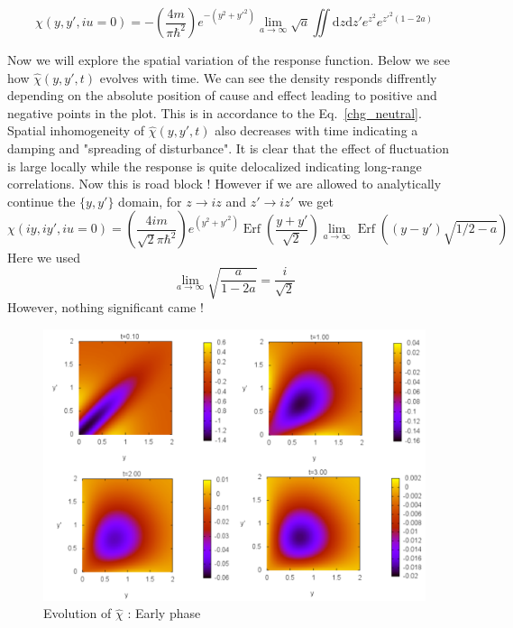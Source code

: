 \documentclass{article}
\newcommand{\eq}{\begin{equation}}
\newcommand{\qe}{\end{equation}}
\DeclareMathOperator{\erf}{Erf}
\newcommand{\lp}{\left(}
\newcommand{\rp}{\right)}
\newcommand{\diff}{\mathrm{d}}
\begin{document}
\eq
\chi(y, y', i u=0)= -\left( \frac{4m}{\pi \hbar^2}\right) e^{-(y^2+{y'}^2)} \lim_{a \to \infty} \sqrt{a} \iint \diff z \diff z' e^{z^2}e^{{z'}^2 \lp 1-2a\rp}
\qe

Now we will explore the spatial variation of the response function. Below we see how $\hat{\chi}(y, y',t)$ evolves with time. We can see the density responds diffrently depending on the absolute position of cause and effect leading to positive and negative points in the plot. This is in accordance to the Eq.~\eqref{chg_neutral}. Spatial inhomogeneity of $\hat{\chi}(y, y',t)$ also decreases with time indicating a damping and "spreading of disturbance". It is clear that the effect of fluctuation is large locally while the response is quite delocalized indicating long-range correlations.
Now this is road block ! However if we are allowed to analytically continue the $\{y, y'\}$ domain, for $z \rightarrow i z $ and $z' \rightarrow i z' $ we get 
\eq
\chi(iy, iy', iu = 0) = \lp\frac{4im}{\sqrt{2}\pi \hbar^2} \rp e^{(y^2+{y'}^2)}\erf\lp {\frac{y+y'}{\sqrt{2}}}\rp \lim_{a \to \infty} \erf\lp\lp y-y' \rp\sqrt{1/2-a}\rp
\qe
Here we used 
\eq
\lim_{a \to \infty}\sqrt{\frac{a}{1-2a}} = \frac{i}{\sqrt{2}} 
\qe
However, nothing significant came ! 
\begin{figure}[H]
\begin{center} 
   \includegraphics[scale=0.4]{plots/Plotpanel1.pdf} 
  \caption{Evolution of $\hat{\chi}$ : Early phase}
  \label{Panel1}
 \end{center}
\end{figure}  
\end{document}
